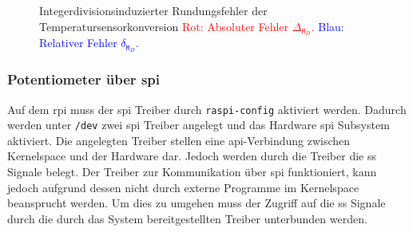 \begin{figure}
    \centering
    \caption[Integerdivisionsinduzierter Rundungsfehler]{Integerdivisionsinduzierter Rundungsfehler der Temperatursensorkonversion
    \textcolor{red}{Rot: Absoluter Fehler $\Delta_{\texttt{M}_D}$.}
    \textcolor{blue}{Blau: Relativer Fehler $\delta_{\texttt{M}_D}$.}
    }
    \label{fig:rounding-err}
\end{figure}



\subsubsection{Potentiometer über \acrshort{spi}}





Auf dem \gls{rpi} muss der \gls{spi} Treiber durch \texttt{raspi-config} aktiviert werden.
Dadurch werden unter \texttt{/dev} zwei \gls{spi} Treiber angelegt und das Hardware \gls{spi} Subsystem aktiviert.
Die angelegten Treiber stellen eine \gls{api}-Verbindung zwischen Kernelspace und der Hardware dar.
Jedoch werden durch die Treiber die \gls{ss} Signale belegt.
Der Treiber zur Kommunikation über \gls{spi} funktioniert, kann jedoch aufgrund dessen nicht durch externe Programme im Kernelspace beansprucht werden.
Um dies zu umgehen muss der Zugriff auf die \gls{ss} Signale durch die durch das System bereitgestellten Treiber unterbunden werden.

